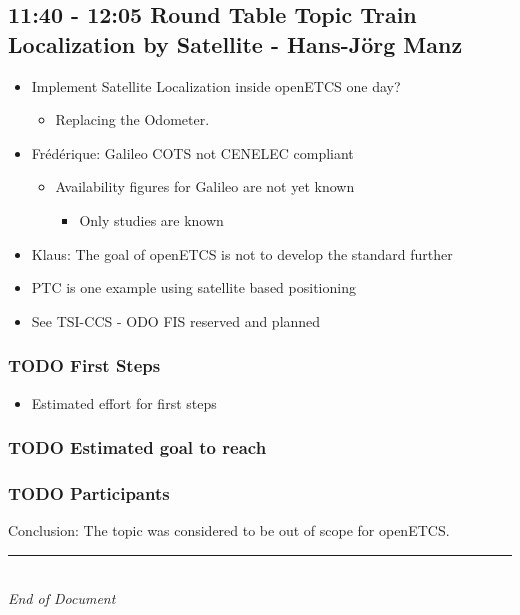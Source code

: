 \documentclass[a4paper,german]{article}
\newcommand{\nl}{\mbox{}\\}
\newcommand{\eod}{\rule{\textwidth}{1pt}\nl \textit{End of Document}}
\begin{document}
\subsection{11:40 - 12:05 Round Table Topic Train Localization by Satellite - Hans-Jörg Manz}
\label{sec-1-7}

\begin{itemize}
\item Implement Satellite Localization inside openETCS one day?
\begin{itemize}
\item Replacing the Odometer.
\end{itemize}
\item Frédérique: Galileo COTS not CENELEC compliant
\begin{itemize}
\item Availability figures for Galileo are not yet known
\begin{itemize}
\item Only studies are known
\end{itemize}
\end{itemize}
\item Klaus: The goal of openETCS is not to develop the standard further
\item PTC is one example using satellite based positioning
\item See TSI-CCS - ODO FIS reserved and planned
\end{itemize}
\subsubsection{\textbf{TODO} First Steps}
\label{sec-1-7-1}

\begin{itemize}
\item Estimated effort for first steps
\end{itemize}
\subsubsection{\textbf{TODO} Estimated goal to reach}
\label{sec-1-7-2}
\subsubsection{\textbf{TODO} Participants}
\label{sec-1-7-3}

       Conclusion: The topic was considered to be out of scope for openETCS.
\label{sec-2}


\eod
\end{document}
